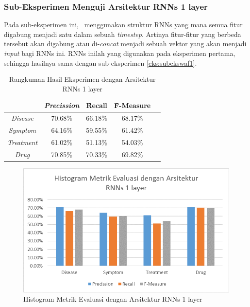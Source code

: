     \subsubsection{Sub-Eksperimen Menguji Arsitektur RNNs 1 layer}\label{eks2:subeksrnn1}
    Pada sub-eksperimen ini, \saya~menggunakan struktur RNNs yang mana semua fitur digabung menjadi satu dalam sebuah \textit{timestep}.
    Artinya fitur-fitur yang berbeda tersebut akan digabung atau di-\textit{concat} menjadi sebuah vektor yang akan menjadi \textit{input} bagi RNNs ini. RNNs inilah yang digunakan pada eksperimen pertama, sehingga hasilnya sama dengan sub-eksperimen \ref{eks:subekswaf1}.
    
    \begin{table}
    	\centering
    	\caption{Rangkuman Hasil Eksperimen dengan Arsitektur RNNs 1 layer}
    	\begin{tabular}{|c|c|c|c|c|}
    		\hline
    		& \textit{Precission} & \f{\f{Recall}} & \f{\f{F-Measure}} \\ \hline
    		\textit{Disease}      & 70.68\%             & 66.18\%        & 68.17\%           \\ \hline
    		\textit{Symptom}      & 64.16\%             & 59.55\%        & 61.42\%           \\ \hline
    		\textit{Treatment}    & 61.02\%             & 51.13\%        & 54.03\%           \\ \hline
    		\textit{Drug}		  & 70.85\%             & 70.33\%        & 69.82\%           \\ \hline
    	\end{tabular}
    	\label{table:owndict9}
    \end{table}
    
    \begin{figure}
    	\centering
    	\includegraphics[width=0.85\linewidth]{images/histogram9}
    	\caption{Histogram Metrik Evaluasi dengan Arsitektur RNNs 1 layer}
    	\label{fig:owndict9}
    \end{figure}
    
